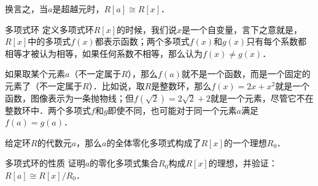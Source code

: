 换言之，当$a$是超越元时，$R[a]\cong R[x]$．

\begin{example}{多项式环}
定义多项式环$R[x]$的时候，我们说$x$是一个自变量，言下之意就是，$R[x]$中的多项式$f(x)$都表示函数；两个多项式$f(x)$和$g(x)$只有每个系数都相等才被认为相等，如果任何系数不相等，那么认为$f(x)\not=g(x)$．

如果取某个元素$a$（不一定属于$R$），那么$f(a)$就不是一个函数，而是一个固定的元素了（不一定属于$R$）．比如说，取$R$是整数环，那么$f(x)=2x+x^2$就是一个函数，图像表示为一条抛物线；但$f(\sqrt{2})=2\sqrt{2}+2$就是一个元素，尽管它不在整数环中．两个多项式$f$和$g$即使不同，也可能对于同一个元素$a$满足$f(a)=g(a)$．

给定环$R$的代数元$a$，那么$a$的全体零化多项式构成了$R[x]$的一个理想$R_0$．


\end{example}

\begin{exercise}{多项式环的性质}
证明$a$的零化多项式集合$R_0$构成$R[x]$的理想，并验证：$R[a]\cong R[x]/R_0$．
\end{exercise}











